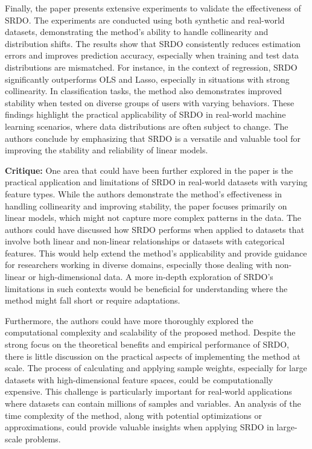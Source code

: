 \documentclass{article}
\theoremstyle{plain}
\theoremstyle{definition}
\theoremstyle{remark}
\begin{document}
Finally, the paper presents extensive experiments to validate the effectiveness of SRDO. The experiments are conducted using both synthetic and real-world datasets, demonstrating the method's ability to handle collinearity and distribution shifts. The results show that SRDO consistently reduces estimation errors and improves prediction accuracy, especially when training and test data distributions are mismatched. For instance, in the context of regression, SRDO significantly outperforms OLS and Lasso, especially in situations with strong collinearity. In classification tasks, the method also demonstrates improved stability when tested on diverse groups of users with varying behaviors. These findings highlight the practical applicability of SRDO in real-world machine learning scenarios, where data distributions are often subject to change. The authors conclude by emphasizing that SRDO is a versatile and valuable tool for improving the stability and reliability of linear models.

\textbf{Critique:} One area that could have been further explored in the paper is the practical application and limitations of SRDO in real-world datasets with varying feature types. While the authors demonstrate the method’s effectiveness in handling collinearity and improving stability, the paper focuses primarily on linear models, which might not capture more complex patterns in the data. The authors could have discussed how SRDO performs when applied to datasets that involve both linear and non-linear relationships or datasets with categorical features. This would help extend the method’s applicability and provide guidance for researchers working in diverse domains, especially those dealing with non-linear or high-dimensional data. A more in-depth exploration of SRDO’s limitations in such contexts would be beneficial for understanding where the method might fall short or require adaptations.

Furthermore, the authors could have more thoroughly explored the computational complexity and scalability of the proposed method. Despite the strong focus on the theoretical benefits and empirical performance of SRDO, there is little discussion on the practical aspects of implementing the method at scale. The process of calculating and applying sample weights, especially for large datasets with high-dimensional feature spaces, could be computationally expensive. This challenge is particularly important for real-world applications where datasets can contain millions of samples and variables. An analysis of the time complexity of the method, along with potential optimizations or approximations, could provide valuable insights when applying SRDO in large-scale problems.
\end{document}
